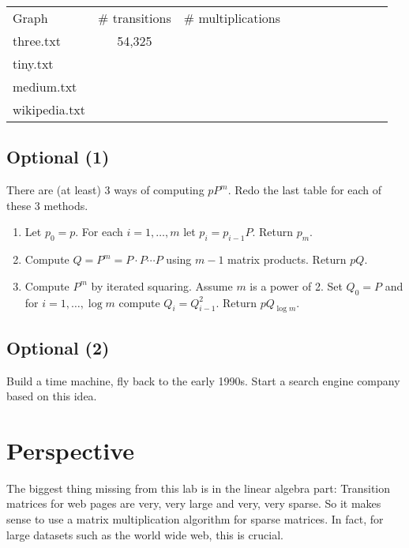 \documentclass{tufte-handout}
\begin{document}
\medskip
\begin{fullwidth}
\small
\begin{tabular}{lcccccccccc}
Graph & \# transitions  & \# multiplications \\
three.txt & 54,325 \\
tiny.txt &\\
medium.txt &\\
wikipedia.txt & \\
\end{tabular}
\end{fullwidth}


\subsection{Optional (1)}

There are (at least) 3 ways of computing $pP^m$.
Redo the last table for each of these 3 methods.
\begin{enumerate} 
\item Let $p_0= p$. For each $i=1,\ldots, m$ let $p_i = p_{i-1}
  P$. Return $p_m$.
\item Compute $Q = P^m = P\cdot P \cdots P$ using $m-1$ matrix products.
  Return $pQ$.
\item Compute $P^m$ by iterated squaring. Assume $m$ is a power of
  2. Set $Q_0 = P$ and for $i=1,\ldots,\log m$ compute $Q_i =
  Q_{i-1}^2$. Return $pQ_{\log m}$. 
\end{enumerate}


\subsection{Optional (2)}

Build a time machine, fly back to the early 1990s.
Start a search engine company based on this idea.


\newpage
\section{Perspective}

The biggest thing missing from this lab is in the linear algebra part:
Transition matrices for web pages are very, very large and very, very
sparse.
So it makes sense to use a matrix multiplication algorithm for sparse
matrices.
In fact, for large datasets such as the world wide web, this is
crucial.
\end{document}
